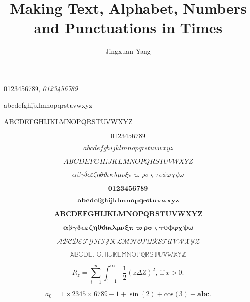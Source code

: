 \documentclass{article}
\title{Making Text, Alphabet, Numbers and Punctuations in Times}
\author{Jingxuan Yang}
\begin{document}
\maketitle

0123456789, \textit{0123456789}

abcdefghijklmnopqrstuvwxyz

ABCDEFGHIJKLMNOPQRSTUVWXYZ

\begin{equation}
  0123456789
\end{equation}

\begin{equation}
  abcdefghijklmnopqrstuvwxyz
\end{equation}

\begin{equation}
  ABCDEFGHIJKLMNOPQRSTUVWXYZ
\end{equation}

\begin{equation}
  \alpha\beta\gamma\delta\epsilon\varepsilon
\zeta\eta\theta\vartheta\iota\kappa\lambda\mu\nu\xi\pi\varpi
\rho\sigma\varsigma\tau\upsilon\phi\varphi\chi\psi\omega
\end{equation}

\begin{equation}
  \bm{0123456789}
\end{equation}

\begin{equation}
  \bm{abcdefghijklmnopqrstuvwxyz}
\end{equation}

\begin{equation}
  \bm{ABCDEFGHIJKLMNOPQRSTUVWXYZ}
\end{equation}

\begin{equation}
  \bm{\alpha\beta\gamma\delta\epsilon\varepsilon
  \zeta\eta\theta\vartheta\iota\kappa\lambda\mu\nu\xi\pi\varpi
  \rho\sigma\varsigma\tau\upsilon\phi\varphi\chi\psi\omega}
\end{equation}

\begin{equation}
  \mathcal{ABCDEFGHIJKLMNOPQRSTUVWXYZ}
\end{equation}

\begin{equation}
  \mathbb{ABCDEFGHIJKLMNOPQRSTUVWXYZ}
\end{equation}

\begin{equation} 
R_{z} =\sum_{i=1}^n\int_{i=1}^\infty \frac12 (z \Delta Z)^2,~\text{if}~x>0.
\end{equation}

\begin{equation}
  a_0=1\times2345\times6789-1+\sin(2)+\mathrm{cos}(3)+\mathbf{abc}.
\end{equation}
\end{document}
